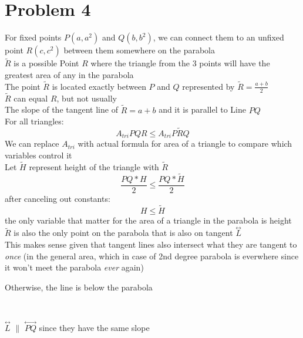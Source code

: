 \documentclass{article}
\begin{document}
\section{Problem 4}
For fixed points $P (a,a^2)$ and $Q(b,b^2)$, we can connect them to an unfixed point $R(c,c^2)$ between them somewhere on the parabola
\\
$\tilde{R}$ is a possible Point $R$ where the triangle from the 3 points will have the greatest area of any in the parabola
\\
The point $\tilde{R}$ is located exactly between $P$ and $Q$ represented by $\tilde{R} = \frac{a+b}{2}$
\\
$\tilde{R}$ can equal $R$, but not usually
\\
The slope of the tangent line of $\tilde{R} = a+b$ and it is parallel to Line $PQ$
\\
For all triangles:
$$ A_{tri}PQR \leq A_{tri}P\tilde{R}Q$$
We can replace $A_{tri}$ with actual formula for area of a triangle to compare which variables control it
\\
Let $\tilde{H}$ represent height of the triangle with $\tilde{R}$
\\
$$ \frac{PQ*H}{2}\leq\frac{PQ*\tilde{H}}{2} $$
after canceling out constants:
$$ H \leq \tilde{H}$$
the only variable that matter for the area of a triangle in the parabola is height
\\
$\tilde{R}$ is also the only point on the parabola that is also on tangent $\stackrel{\leftrightarrow}{L}$
\\
This makes sense given that tangent lines also intersect what they are tangent to \textit{once} (in the general area, which in case of 2nd degree parabola is everwhere since it won't meet the parabola \textit{ever} again) 
\begin{center}
Otherwise, the line is below the parabola
\end{center}
\\
\begin{center}
$\stackrel{\leftrightarrow}{L}$  $\parallel$ $\stackrel{\leftrightarrow}{PQ}$ since they have the same slope
\end{center}
\end{document}
